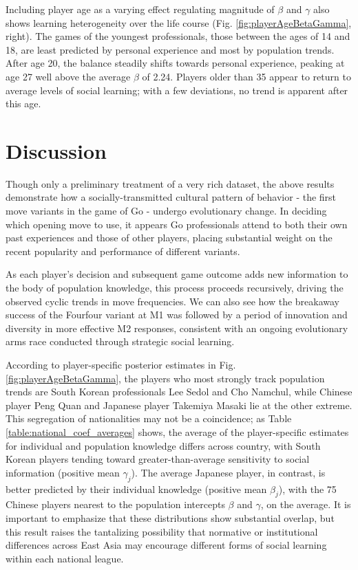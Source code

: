 \documentclass[reqno,12pt]{amsart}
\begin{document}
Including player age as a varying effect regulating magnitude of $\beta$ and $\gamma$ also shows learning heterogeneity over the life course (Fig. \ref{fig:playerAgeBetaGamma}, right). The games of the youngest professionals, those between the ages of 14 and 18, are least predicted by personal experience and most by population trends. After age 20, the balance steadily shifts towards personal experience, peaking at age 27 well above the average $\beta$ of 2.24. Players older than 35 appear to return to average levels of social learning; with a few deviations, no trend is apparent after this age.

\section{Discussion}

Though only a preliminary treatment of a very rich dataset, the above results demonstrate how a socially-transmitted cultural pattern of behavior - the first move variants in the game of Go - undergo evolutionary change. In deciding which opening move to use, it appears Go professionals attend to both their own past experiences and those of other players, placing substantial weight on the recent popularity and performance of different variants.

As each player's decision and subsequent game outcome adds new information to the body of population knowledge, this process proceeds recursively, driving the observed cyclic trends in move frequencies. We can also see how the breakaway success of the Fourfour variant at M1 was followed by a period of innovation and diversity in more effective M2 responses, consistent with an ongoing evolutionary arms race conducted through strategic social learning.

According to player-specific posterior estimates in Fig. \ref{fig:playerAgeBetaGamma}, the players who most strongly track population trends are South Korean professionals Lee Sedol and Cho Namchul, while Chinese player Peng Quan and Japanese player Takemiya Masaki lie at the other extreme. This segregation of nationalities may not be a coincidence; as Table \ref{table:national_coef_averages} shows, the average of the player-specific estimates for individual and population knowledge differs across country, with South Korean players tending toward greater-than-average sensitivity to social information (positive mean $\gamma_j$). The average Japanese player, in contrast, is better predicted by their individual knowledge (positive mean $\beta_j$), with the 75 Chinese players nearest to the population intercepts $\beta$ and $\gamma$, on the average. It is important to emphasize that these distributions show substantial overlap, but this result raises the tantalizing possibility that normative or institutional differences across East Asia may encourage different forms of social learning within each national league.
\end{document}
